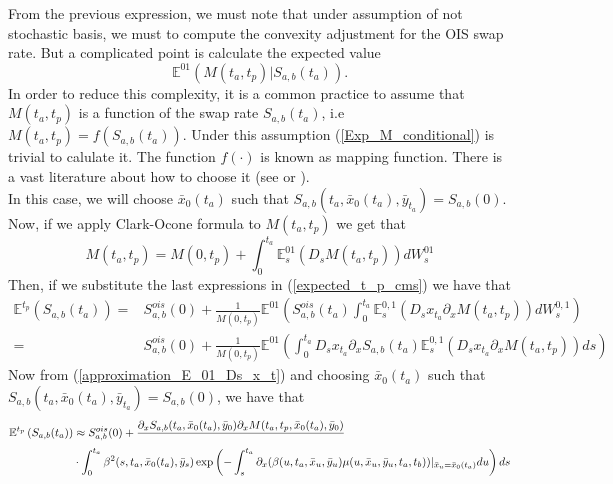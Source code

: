 \documentclass[a4paper,10pt]{article}
\newcommand{\1}{\mathbf{1}}
\begin{document}
From the previous expression, we must note that under assumption of not stochastic basis, we must to compute the convexity adjustment for the OIS swap rate. But a complicated point is calculate the expected value 
\begin{equation}\label{Exp_M_conditional}
\mathbb{E}^{01}\left( M(t_a,t_p)|S_{a,b}(t_a)\right).
\end{equation}
In order to reduce this complexity, it is a common practice to assume that $M(t_a,t_p)$ is a function of the swap rate $S_{a,b}(t_a)$, i.e   $M(t_a,t_p)=f(S_{a,b}(t_a))$. Under this assumption (\ref{Exp_M_conditional}) is trivial to calulate it. The function $f(\cdot)$ is known as mapping function. There is a vast literature about how to choose it (see \cite{AndreasenPiterbargIII} or \cite{Hagan20}). \\ 
In this case, we will choose $\bar{x}_0(t_a)$ such that $S_{a,b}(t_a,\bar{x}_0(t_a),\bar{y}_{t_a})=S_{a,b}(0)$. Now, if we apply Clark-Ocone formula to $M(t_a,t_p)$ we get that
\begin{equation} \label{clark_ocone_swap_m}
M(t_a,t_p) = M(0,t_p)+ \int_{0}^{t_a} \mathbb{E}_s^{01}\left(D_s M(t_a,t_p)\right) dW^{01}_s
\end{equation}
Then, if we substitute the last expressions in (\ref{expected_t_p_cms}) we have that
\begin{align}\label{cms_first_order_convexity_prev}
\mathbb{E}^{t_p}\left(S_{a,b}(t_a)\right) =& S^{ois}_{a,b}(0) + \frac{1}{M(0,t_p)} \mathbb{E}^{01}\left( S^{ois}_{a,b}(t_a) \int_{0}^{t_a} \mathbb{E}^{0,1}_s\left(D_s x_{t_a}\partial_x M(t_a,t_p)  \right) dW^{0,1}_s   \right) \nonumber \\
=&  S^{ois}_{a,b}(0) + \frac{1}{M(0,t_p)} \mathbb{E}^{01}\left(\int_{0}^{t_a} D_s x_{t_a} \partial_x S_{a,b}(t_a) \mathbb{E}^{0,1}_s\left(D_s x_{t_a}\partial_x M(t_a,t_p)  \right) ds   \right)
\end{align}
Now from (\ref{approximation_E_01_Ds_x_t}) and choosing $\bar{x}_0(t_a)$ such that $S_{a,b}(t_a,\bar{x}_0(t_a),\bar{y}_{t_a})=S_{a,b}(0)$, we have that
\begin{align}
\mathbb{E}^{t_p}\left(S_{a,b}(t_a)\right) &\approx  S^{ois}_{a,b}(0) + \frac{\partial_x S_{a,b}(t_a,\bar{x}_0(t_a), \bar{y}_0) \partial_x M(t_a,t_p,\bar{x}_0(t_a), \bar{y}_0)} \nonumber \\
&\cdot \int_{0}^{t_a}  \beta^2(s,t_a,\bar{x}_0(t_a),\bar{y}_s)\exp\left(-\int_{s}^{t_a}\partial_x (\beta(u,t_a,\bar{x}_u,\bar{y}_u) \mu(u,\bar{x}_u, \bar{y}_u,t_a,t_b))|_{\bar{x}_u=\bar{x}_{0}(t_a)}  du \right)ds 
\end{align}





%
\end{document}
